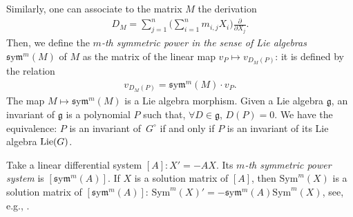\documentclass[pdftex]{sigma}%
\numberwithin{equation}{section}
\def\Sym{\mathrm{Sym}}
\def\sym{\mathfrak{s}\mathrm{y}\mathfrak{m}}
\begin{document}
Similarly, one can associate to the matrix $M$ the derivation
\begin{gather*}
D_{M}=\sum_{j=1}^n \bigg(\sum_{i=1}^n m_{i,j} X_{i}\bigg)\frac{\partial}{\partial X_{j}}.
\end{gather*}
Then, we define the \emph{$m$-th symmetric power in the sense of Lie algebras} $\sym^{m}(M)$ of $M$ as the matrix of the linear map $v_{P} \mapsto v_{D_{M}(P)}$: it is defined by the relation
\begin{gather*}
v_{D_{M}(P)}=\sym^{m}(M) \cdot v_{P}.
\end{gather*}
The map $M \mapsto \sym^{m}(M)$ is a Lie algebra morphism.
Given a Lie algebra $\mathfrak{g}$, an invariant of $\mathfrak{g}$ is a polynomial
$P$ such that, $\forall D\in \mathfrak{g}$, $D(P)=0$. We have the equivalence: $P$ is an invariant of~$G^{\circ}$ if and only if $P$ is an invariant of its Lie algebra ${\rm Lie}(G)$.


Take a linear differential system $[A]\colon X' = -A X$. Its \emph{$m$-th symmetric power system}
is $[\sym^m (A)]$. If $X$ is a solution matrix of $[A]$, then $\Sym^m(X)$ is a solution matrix of
$[\sym^m (A)]$: $\Sym^m(X)'=-\sym^m(A)\Sym^m(X)$, see, e.g.,
\cite{ApCoWe13a, PS}.
\end{document}
